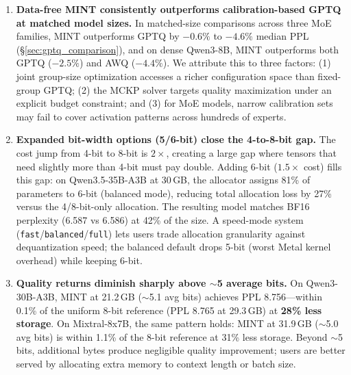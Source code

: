 \documentclass{article}
\begin{document}
\begin{enumerate}
\item \textbf{Data-free MINT consistently outperforms calibration-based GPTQ at matched model sizes.}
In matched-size comparisons across three MoE families, MINT outperforms GPTQ by $-0.6\%$ to $-4.6\%$ median PPL (\S\ref{sec:gptq_comparison}), and on dense Qwen3-8B, MINT outperforms both GPTQ ($-2.5\%$) and AWQ ($-4.4\%$). We attribute this to three factors: (1) joint group-size optimization accesses a richer configuration space than fixed-group GPTQ; (2) the MCKP solver targets quality maximization under an explicit budget constraint; and (3) for MoE models, narrow calibration sets may fail to cover activation patterns across hundreds of experts.

\item \textbf{Expanded bit-width options (5/6-bit) close the 4-to-8-bit gap.}
The cost jump from 4-bit to 8-bit is $2\times$, creating a large gap where tensors that need slightly more than 4-bit must pay double. Adding 6-bit ($1.5\times$ cost) fills this gap: on Qwen3.5-35B-A3B at 30\,GB, the allocator assigns 81\% of parameters to 6-bit (balanced mode), reducing total allocation loss by 27\% versus the 4/8-bit-only allocation. The resulting model matches BF16 perplexity (6.587 vs 6.586) at 42\% of the size. A speed-mode system (\texttt{fast}/\texttt{balanced}/\texttt{full}) lets users trade allocation granularity against dequantization speed; the balanced default drops 5-bit (worst Metal kernel overhead) while keeping 6-bit.

\item \textbf{Quality returns diminish sharply above ${\sim}$5 average bits.}
On Qwen3-30B-A3B, MINT at 21.2\,GB (${\sim}$5.1 avg bits) achieves PPL 8.756---within 0.1\% of the uniform 8-bit reference (PPL 8.765 at 29.3\,GB) at \textbf{28\% less storage}. On Mixtral-8x7B, the same pattern holds: MINT at 31.9\,GB (${\sim}$5.0 avg bits) is within 1.1\% of the 8-bit reference at 31\% less storage. Beyond ${\sim}$5 bits, additional bytes produce negligible quality improvement; users are better served by allocating extra memory to context length or batch size.


\end{enumerate}
\end{document}
